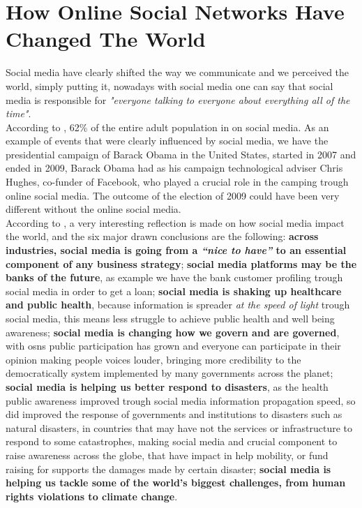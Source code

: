 \section{How Online Social Networks Have Changed The World}

Social media have clearly shifted the way we communicate and we perceived the world, simply putting it, nowadays with social media one can say that social media is responsible for \textit{"everyone talking to everyone about everything all of the time"}.\\
\indent According to \cite{demogsmu}, 62\% of the entire adult population in on social media. As an example of events that were clearly influenced by social media, we have the presidential campaign of Barack Obama in the United States, started in 2007 and ended in 2009, Barack Obama had as his campaign technological adviser Chris Hughes, co-funder of Facebook, who played a crucial role in the camping trough online social media. The outcome of the election of 2009 could have been very different without the online social media.\\
\indent According to \cite{6wayschange}, a very interesting reflection is made on how social media impact the world, and the six major drawn conclusions are the following: \textbf{across industries, social media is going from a \textit{“nice to have”} to an essential component of any business strategy}; \textbf{social media platforms may be the banks of the future}, as example we have the bank customer profiling trough social media in order to get a loan; \textbf{social media is shaking up healthcare and public health}, because information is spreader \textit{at the speed of light} trough social media, this means less struggle to achieve public health and well being awareness; \textbf{social media is changing how we govern and are governed}, with \glspl{osn} public participation has grown and everyone can participate in their opinion making people voices louder, bringing more credibility to the democratically system implemented by many governments across the planet; \textbf{social media is helping us better respond to disasters}, as the health public awareness improved trough social media information propagation speed, so did improved the response of governments and institutions to disasters such as natural disasters, in countries that may have not the services or infrastructure to respond to some catastrophes, making social media and crucial component to raise awareness across the globe, that have impact in help mobility, or fund raising for supports the damages made by certain disaster; \textbf{social media is helping us tackle some of the world’s biggest challenges, from human rights violations to climate change}.\\

